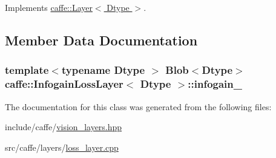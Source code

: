 Implements \hyperlink{classcaffe_1_1_layer_abd13c6489c13953b4fbcfcf6880835d0}{caffe\+::\+Layer$<$ Dtype $>$}.



\subsection{Member Data Documentation}
\hypertarget{classcaffe_1_1_infogain_loss_layer_a2d9ffe8c64b096042cc75fced30dcaca}{
\subsubsection[{infogain\+\_\+}]{\setlength{\rightskip}{0pt plus 5cm}template$<$typename Dtype $>$ {\bf Blob}$<$Dtype$>$ {\bf caffe\+::\+Infogain\+Loss\+Layer}$<$ Dtype $>$\+::infogain\+\_\+\hspace{0.3cm}{\ttfamily [protected]}}}\label{classcaffe_1_1_infogain_loss_layer_a2d9ffe8c64b096042cc75fced30dcaca}


The documentation for this class was generated from the following files\+:\begin{DoxyCompactItemize}
\item 
include/caffe/\hyperlink{vision__layers_8hpp}{vision\+\_\+layers.\+hpp}\item 
src/caffe/layers/\hyperlink{loss__layer_8cpp}{loss\+\_\+layer.\+cpp}\end{DoxyCompactItemize}
